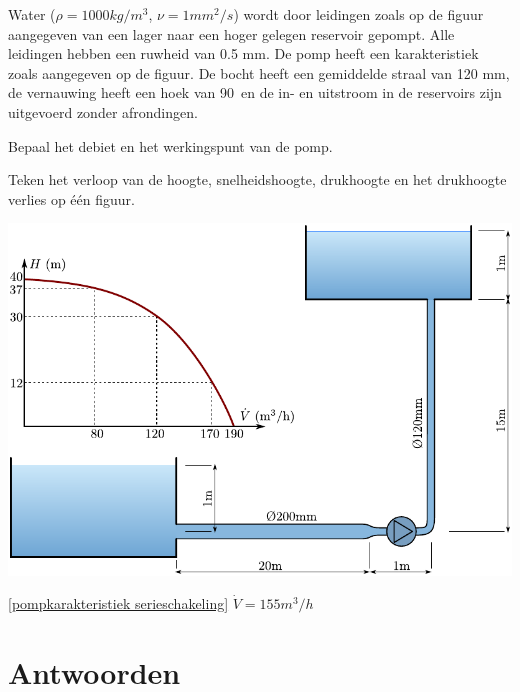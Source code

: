 \begin{toepassing}[*]
	\label{pompkarakteristiek serieschakeling}
Water ($\rho=1000 \unit{kg/m^3}$, $\nu=1 \unit{mm^2/s}$) wordt door leidingen zoals op de figuur aangegeven van een lager naar een hoger gelegen reservoir gepompt. Alle leidingen hebben een ruwheid van 0.5 mm. De pomp heeft een karakteristiek zoals aangegeven op de figuur. De bocht heeft een gemiddelde straal van 120 mm, de vernauwing heeft een hoek van 90\deg\ en de in- en uitstroom in de reservoirs zijn uitgevoerd zonder afrondingen.
		
Bepaal het debiet en het werkingspunt van de pomp.
		
Teken het verloop van de hoogte, snelheidshoogte, drukhoogte en het drukhoogte verlies op één figuur.

	\centering
	\includegraphics{fig/stroming_in_leidingen/pompopvoerhoogte}
\end{toepassing}
\begin{antwoord}{\ref{pompkarakteristiek serieschakeling}}
	$\dot{V} = 155 \unit{m^3/h}$
\end{antwoord}
\section*{Antwoorden}
	\begin{multicols}{2}
	\end{multicols}